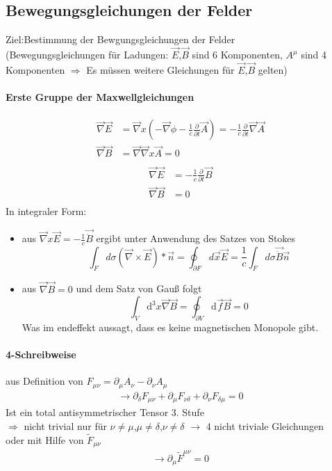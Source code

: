 \documentclass[a4paper]{article}
\begin{document}
\subsection{Bewegungsgleichungen der Felder}
Ziel:Bestimmung der Bewgungsgleichungen der Felder\\
(Bewegungsgleichungen für Ladungen: $\vec{E}$,$\vec{B}$ sind 6 Komponenten,
$A^\mu$ sind 4 Komponenten $\Rightarrow$ Es müssen weitere Gleichungen für
$\vec{E}$,$\vec{B}$ gelten)
\paragraph{Erste Gruppe der Maxwellgleichungen}
\begin{align}
\vec{\nabla} \vec{E}&=
\vec{\nabla}x(-\vec{\nabla}\phi-\frac{1}{c}\frac{\partial}{\partial
t}\vec{A})=-\frac{1}{c}\frac{\partial}{\partial t}\vec{\nabla}\vec{A}\\
\vec{\nabla}\vec{B}&= \vec{\nabla}\vec{\nabla}x\vec{A}=0\\  
\end{align}
\begin{align}
\vec{\nabla} \vec{E}&=-\frac{1}{c}\frac{\partial}{\partial t}\vec{B} \\
\vec{\nabla}\vec{B}&= 0\\
\end{align}
In integraler Form:
\begin{itemize}
  \item aus $\vec{\nabla}x\vec{E}=-\frac{1}{c}\vec{\ddot{B}}$ ergibt unter
  Anwendung des Satzes von Stokes \begin{equation}
  \int_F d\sigma (\vec{\nabla}\times\vec{E})*\vec{n}=\oint_{\partial
  F}d\vec{x}\vec{E}=\frac{1}{c}\int_F d\sigma \vec{\ddot{B}}\vec{n}
  \end{equation}
  \item aus $\vec{\nabla}\vec{B}=0$ und dem Satz von Gauß folgt \begin{equation}
  \int_V \mathrm{d}^3x\vec{\nabla}\vec{B}=\oint_{\partial V}\mathrm{d}\vec{f}\vec{B}=0
  \end{equation}
  Was im endeffekt aussagt, dass es keine magnetischen Monopole gibt.
\end{itemize}

\paragraph{4-Schreibweise}
aus Definition von $F_{\mu\nu}=\partial_\mu A_\nu-\partial_\nu A_\mu$
\begin{align}
\rightarrow \partial_\delta F_{\mu\nu} +\partial_\mu F_{\nu\delta}
+\partial_\nu F_{\delta\mu} =0
\end{align} 
Ist ein total antisymmetrischer Tensor 3. Stufe\\
$\Rightarrow$ nicht trivial nur für $\nu\neq\mu$,$\mu\neq\delta$,$\nu\neq\delta$
$\rightarrow$ 4 nicht triviale Gleichungen\\
oder mit Hilfe von $\tilde{F}_{\mu\nu}$\\
\begin{align}
\rightarrow \partial_\mu\tilde{F}^{\mu\nu}=0
\end{align}
\end{document}
